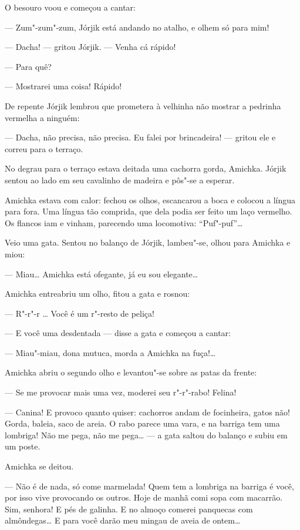 O besouro voou e começou a cantar:

--- Zum"-zum"-zum, Jórjik está andando no atalho, e olhem só para mim!

--- Dacha! --- gritou Jórjik. --- Venha cá rápido!

--- Para quê?

--- Mostrarei uma coisa! Rápido!

De repente Jórjik lembrou que prometera à velhinha não mostrar a
pedrinha vermelha a ninguém:

--- Dacha, não precisa, não precisa. Eu falei por brincadeira! ---
gritou ele e correu para o terraço.

No degrau para o terraço estava deitada uma cachorra gorda, Amichka.
Jórjik sentou ao lado em seu cavalinho de madeira e pôs"-se a esperar.

Amichka estava com calor: fechou os olhos, escancarou a boca e colocou a
língua para fora. Uma língua tão comprida, que dela podia ser feito um
laço vermelho. Os flancos iam e vinham, parecendo uma locomotiva:
``Puf"-puf''\ldots{}

Veio uma gata. Sentou no balanço de Jórjik, lambeu"-se, olhou para Amichka
e miou:

--- Miau\ldots{} Amichka está ofegante, já eu sou elegante\ldots{}

Amichka entreabriu um olho, fitou a gata e rosnou:

--- R"-r"-r \ldots{} Você é um r"-resto de peliça!

--- E você uma desdentada --- disse a gata e começou a cantar:

--- Miau"-miau, dona mutuca, morda a Amichka na fuça!\ldots{}

Amichka abriu o segundo olho e levantou"-se sobre as patas da frente:

--- Se me provocar mais uma vez, moderei seu r"-r"-rabo! Felina!

--- Canina! E provoco quanto quiser: cachorros andam de focinheira,
gatos não! Gorda, baleia, saco de areia. O rabo parece uma vara, e na
barriga tem uma lombriga! Não me pega, não me pega\ldots{} --- a gata saltou
do balanço e subiu em um poste.

Amichka se deitou.

--- Não é de nada, só come marmelada! Quem tem a lombriga na barriga é
você, por isso vive provocando os outros. Hoje de manhã comi sopa com
macarrão. Sim, senhora! E pés de galinha. E no almoço comerei panquecas
com almôndegas\ldots{} E para você darão meu mingau de aveia de ontem\ldots{}

